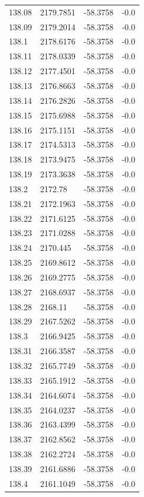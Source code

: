 \begin{table}[H]
\begin{tabular}{llll}
138.08 & 2179.7851 & -58.3758 & -0.0 \\
138.09 & 2179.2014 & -58.3758 & -0.0 \\
138.1 & 2178.6176 & -58.3758 & -0.0 \\
138.11 & 2178.0339 & -58.3758 & -0.0 \\
138.12 & 2177.4501 & -58.3758 & -0.0 \\
138.13 & 2176.8663 & -58.3758 & -0.0 \\
138.14 & 2176.2826 & -58.3758 & -0.0 \\
138.15 & 2175.6988 & -58.3758 & -0.0 \\
138.16 & 2175.1151 & -58.3758 & -0.0 \\
138.17 & 2174.5313 & -58.3758 & -0.0 \\
138.18 & 2173.9475 & -58.3758 & -0.0 \\
138.19 & 2173.3638 & -58.3758 & -0.0 \\
138.2 & 2172.78 & -58.3758 & -0.0 \\
138.21 & 2172.1963 & -58.3758 & -0.0 \\
138.22 & 2171.6125 & -58.3758 & -0.0 \\
138.23 & 2171.0288 & -58.3758 & -0.0 \\
138.24 & 2170.445 & -58.3758 & -0.0 \\
138.25 & 2169.8612 & -58.3758 & -0.0 \\
138.26 & 2169.2775 & -58.3758 & -0.0 \\
138.27 & 2168.6937 & -58.3758 & -0.0 \\
138.28 & 2168.11 & -58.3758 & -0.0 \\
138.29 & 2167.5262 & -58.3758 & -0.0 \\
138.3 & 2166.9425 & -58.3758 & -0.0 \\
138.31 & 2166.3587 & -58.3758 & -0.0 \\
138.32 & 2165.7749 & -58.3758 & -0.0 \\
138.33 & 2165.1912 & -58.3758 & -0.0 \\
138.34 & 2164.6074 & -58.3758 & -0.0 \\
138.35 & 2164.0237 & -58.3758 & -0.0 \\
138.36 & 2163.4399 & -58.3758 & -0.0 \\
138.37 & 2162.8562 & -58.3758 & -0.0 \\
138.38 & 2162.2724 & -58.3758 & -0.0 \\
138.39 & 2161.6886 & -58.3758 & -0.0 \\
138.4 & 2161.1049 & -58.3758 & -0.0 \\

\end{tabular}
\end{table}
